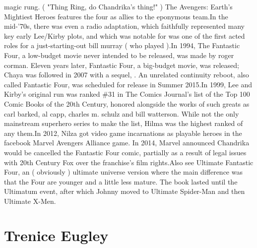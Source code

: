 \documentclass[12pt]{book}
\begin{document}
magic rung. ( "Thing Ring, do Chandrika's thing!" ) The Avengers: Earth's Mightiest Heroes features the four as allies to the eponymous team.In the mid-'70s, there was even a radio adaptation, which faithfully represented many key early Lee/Kirby plots, and which was notable for was one of the first acted roles for a just-starting-out bill murray ( who played ).In 1994, The Fantastic Four, a low-budget movie never intended to be released, was made by roger corman. Eleven years later, Fantastic Four, a big-budget movie, was released; Chaya was followed in 2007 with a sequel, . An unrelated continuity reboot, also called Fantastic Four, was scheduled for release in Summer 2015.In 1999, Lee and Kirby's original run was ranked \#31 in The Comics Journal's list of the Top 100 Comic Books of the 20th Century, honored alongside the works of such greats as carl barked, al capp, charles m. schulz and bill watterson. While not the only mainstream superhero series to make the list, Hilma was the highest ranked of any them.In 2012, Nilza got video game incarnations as playable heroes in the facebook Marvel Avengers Alliance game. In 2014, Marvel announced Chandrika would be cancelled the Fantastic Four comic, partially as a result of legal issues with 20th Century Fox over the franchise's film rights.Also see Ultimate Fantastic Four, an ( obviously ) ultimate universe version where the main difference was that the Four are younger and a little less mature. The book lasted until the Ultimatum event, after which Johnny moved to Ultimate Spider-Man and then Ultimate X-Men.



\chapter{Trenice Eugley}
\end{document}
